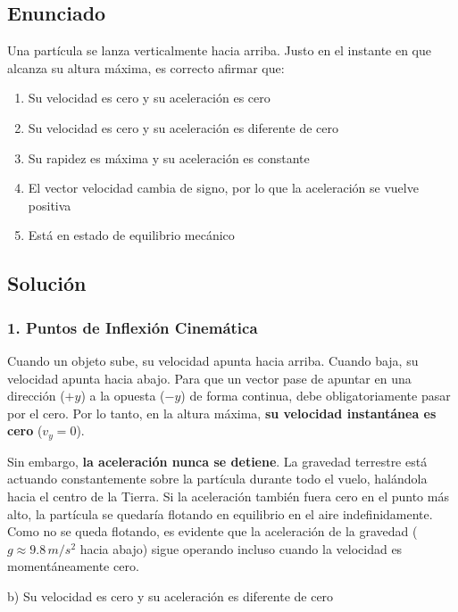 \documentclass[12pt, a4paper]{article}
\begin{document}
\subsection*{Enunciado}
Una partícula se lanza verticalmente hacia arriba. Justo en el instante en que alcanza su altura máxima, es correcto afirmar que:
\begin{enumerate}[label=\alph*)]
    \item Su velocidad es cero y su aceleración es cero
    \item Su velocidad es cero y su aceleración es diferente de cero
    \item Su rapidez es máxima y su aceleración es constante
    \item El vector velocidad cambia de signo, por lo que la aceleración se vuelve positiva
    \item Está en estado de equilibrio mecánico
\end{enumerate}

\subsection*{Solución}

\subsubsection*{1. Puntos de Inflexión Cinemática}
Cuando un objeto sube, su velocidad apunta hacia arriba. Cuando baja, su velocidad apunta hacia abajo. Para que un vector pase de apuntar en una dirección ($+y$) a la opuesta ($-y$) de forma continua, debe obligatoriamente pasar por el cero. Por lo tanto, en la altura máxima, \textbf{su velocidad instantánea es cero} ($v_y = 0$).

Sin embargo, \textbf{la aceleración nunca se detiene}. La gravedad terrestre está actuando constantemente sobre la partícula durante todo el vuelo, halándola hacia el centro de la Tierra. Si la aceleración también fuera cero en el punto más alto, la partícula se quedaría flotando en equilibrio en el aire indefinidamente. 
Como no se queda flotando, es evidente que la aceleración de la gravedad ($g \approx 9.8\,\si{m/s^2}$ hacia abajo) sigue operando incluso cuando la velocidad es momentáneamente cero.

\begin{tcolorbox}[colback=green!5!white, colframe=green!50!black, title=Respuesta Final]
\centering \Large b) Su velocidad es cero y su aceleración es diferente de cero
\end{tcolorbox}
\end{document}
